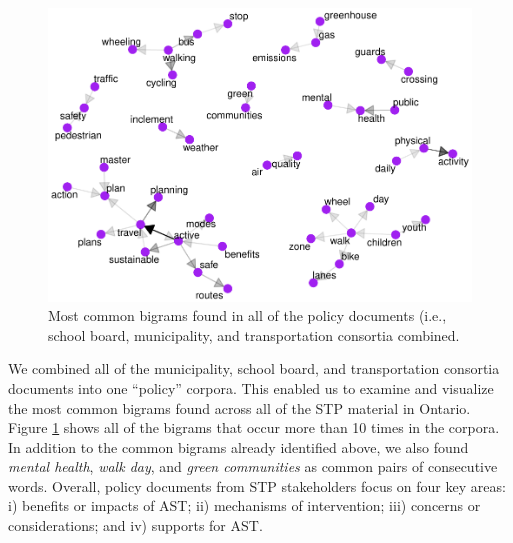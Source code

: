 \documentclass[]{elsarticle} %
\begin{document}
\begin{figure}

{\centering \includegraphics[width=1\linewidth]{AST-Framing-Ontario_files/figure-latex/policy-visual-1} 

}

\caption{Most common bigrams found in all of the policy documents (i.e., school board, municipality, and transportation consortia combined.}\label{fig:policy-visual}
\end{figure}

We combined all of the municipality, school board, and transportation
consortia documents into one ``policy'' corpora. This enabled us to
examine and visualize the most common bigrams found across all of the
STP material in Ontario. Figure \ref{fig:policy-visual} shows all of the
bigrams that occur more than 10 times in the corpora. In addition to the
common bigrams already identified above, we also found \emph{mental
health}, \emph{walk day}, and \emph{green communities} as common pairs
of consecutive words. Overall, policy documents from STP stakeholders
focus on four key areas: i) benefits or impacts of AST; ii) mechanisms
of intervention; iii) concerns or considerations; and iv) supports for
AST.
\end{document}
